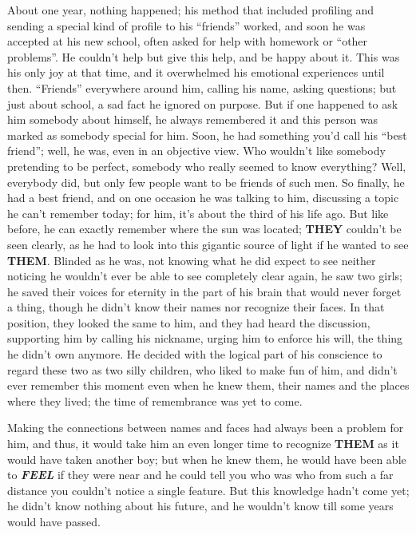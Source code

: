 About one year, nothing happened; his method that included profiling and sending a special kind of profile to his \enquote{friends} worked, and soon he was accepted at his new school, often asked for help with homework or \enquote{other problems}. He couldn't help but give this help, and be happy about it. This was his only joy at that time, and it overwhelmed his emotional experiences until then. \enquote{Friends} everywhere around him, calling his name, asking questions; but just about school, a sad fact he ignored on purpose. But if one happened to ask him somebody about himself, he always remembered it and this person was marked as somebody special for him. Soon, he had something you'd call his \enquote{best friend}; well, he was, even in an objective view. Who wouldn't like somebody pretending to be perfect, somebody who really seemed to know everything? Well, everybody did, but only few people want to be friends of such men. So finally, he had a best friend, and on one occasion he was talking to him, discussing a topic he can't remember today; for him, it's about the third of his life ago. But like before, he can exactly remember where the sun was located; \textbf{THEY} couldn't be seen clearly, as he had to look into this gigantic source of light if he wanted to see \textbf{THEM}. Blinded as he was, not knowing what he did expect to see neither noticing he wouldn't ever be able to see completely clear again, he saw two girls; he saved their voices for eternity in the part of his brain that would never forget a thing, though he didn't know their names nor recognize their faces. In that position, they looked the same to him, and they had heard the discussion, supporting him by calling his nickname, urging him to enforce his will, the thing he didn't own anymore. He decided with the logical part of his conscience to regard these two as two silly children, who liked to make fun of him, and didn't ever remember this moment even when he knew them, their names and the places where they lived; the time of remembrance was yet to come.

Making the connections between names and faces had always been a problem for him, and thus, it would take him an even longer time to recognize \textbf{THEM} as it would have taken another boy; but when he knew them, he would have been able to \emph{\textbf{FEEL}} if they were near and he could tell you who was who from such a far distance you couldn't notice a single feature. But this knowledge hadn't come yet; he didn't know nothing about his future, and he wouldn't know till some years would have passed. 

